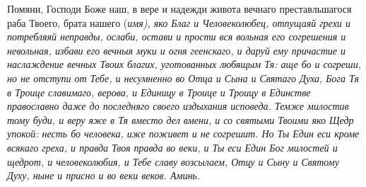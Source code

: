 \mychapterending




Помяни, Господи Боже наш, в вере и надежди живота вечнаго преставльшагося раба Твоего, брата нашего (\itshape имя\normalfont{}), яко Благ и Человеколюбец, отпущаяй грехи и потребляяй неправды, ослаби, остави и прости вся вольная его согрешения и невольная, избави его вечныя муки и огня геенскаго, и даруй ему причастие и наслаждение вечных Твоих благих, уготованных любящым Тя: аще бо и согреши, но не отступи от Тебе, и несумненно во Отца и Сына и Святаго Духа, Бога Тя в Троице славимаго, верова, и Единицу в Троице и Троицу в Единстве православно даже до последняго своего издыхания исповеда. Темже милостив тому буди, и веру яже в Тя вместо дел вмени, и со святыми Твоими яко Щедр упокой: несть бо человека, иже поживет и не согрешит. Но Ты Един еси кроме всякаго греха, и правда Твоя правда во веки, и Ты еси Един Бог милостей и щедрот, и человеколюбия, и Тебе славу возсылаем, Отцу и Сыну и Святому Духу, ныне и присно и во веки веков. Аминь. 


\mychapterending




